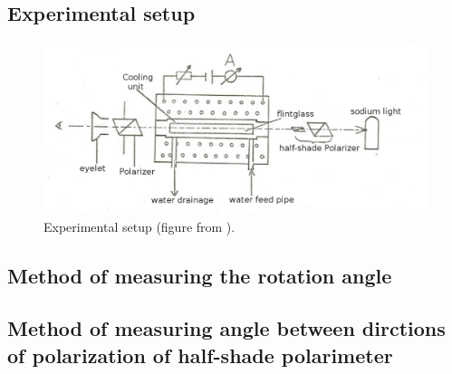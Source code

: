 \subsection{Experimental setup}
\begin{figure}
    \begin{centering}
        \includegraphics[width=18cm]{figures/faraday_setup2}
        \caption{Experimental setup (figure from \cite{staatsexamen}).}
        \label{fig:faraday_setup}
    \end{centering}
\end{figure}


\subsection{Method of measuring the rotation angle}

\subsection{Method of measuring angle between dirctions of polarization of half-shade polarimeter}
